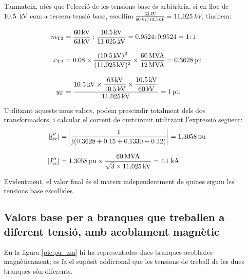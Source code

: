 \begin{exemple}[\MetodeCalculPU{}]
     Tanmateix, atès que l'elecció de les tensions base és
     arbitrària, si en lloc de \qty{10,5}{kV} com a tercera tensió base,
     escollim
     $\frac{\qty{63}{kV}}{\qty{60}{kV} / \qty{10,5}{kV}}=\qty{11,025}{kV}$,
     tindrem:

    \begin{align*}
       m\ped{T2} &= \frac{\qty{60}{kV}}{\qty{63}{kV}} : \frac{\qty{10,5}{kV}}{\qty{11,025}{kV}}
       = \num{0,9524}\!:\!\num{0,9524} = 1\!:\!1 \\[3mm]
       x\ped{T2} &= \num{0,08} \times \frac{(\qty{10,5}{kV})^2}{(\qty{11,025}{kV})^2 } \times
       \frac{\qty{60}{MVA}}{\qty{12}{MVA}}  = \qty{0,3628}{pu}\\[3mm]
       \cmplx{u}\ped{F} &= \frac{\qty{10,5}{kV} \times \dfrac{\qty{63}{kV}}{\qty{10,5}{kV}} \times
       \dfrac{\qty{10,5}{kV}}{\qty{60}{kV}}}{\qty{11,025}{kV}} = \qty{1}{pu}
    \end{align*}

    Utilitzant aquests nous valors, podem prescindir totalment dels dos
    transformadors, i calcular el corrent de curtcircuit utilitzant
    l'expressió següent:
    \begin{align*}
    |\cmplx{i}''\ped{cc}| &= \left| \frac{1}{\ju ( \num{0,3628} + \num{0,15} +
    \num{0,1330} + \num{0,12} )} \right| = \qty{1,3058}{pu} \\[3mm]
    |\cmplx{I}''\ped{cc}| &=
    \qty{1,3058}{pu}\times\frac{\qty{60}{MVA}}{\sqrt{3}\times \qty{11,025}{kV}} =
    \qty{4,1}{kA}
    \end{align*}

    Evidentment, el valor final és el mateix independentment de quines
    siguin les tensions base escollides.
\end{exemple}

\subsection{Valors base per a branques que treballen a diferent tensió, amb acoblament magnètic}

En la figura \vref{pic:pu_zm} hi ha representades dues branques acoblades magnèticament; es fa el supòsit addicional que les tensions de treball de les dues branques són diferents.

\begin{center}
    
    \label{pic:pu_zm}
\end{center}

